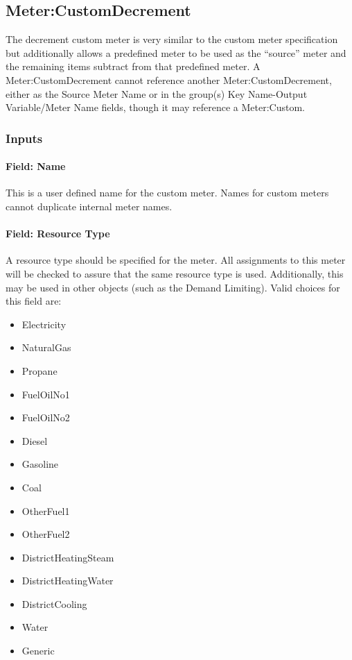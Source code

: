 \subsection{Meter:CustomDecrement}\label{metercustomdecrement}

The decrement custom meter is very similar to the custom meter specification but additionally allows a predefined meter to be used as the ``source'' meter and the remaining items subtract from that predefined meter. A Meter:CustomDecrement cannot reference another Meter:CustomDecrement, either as the Source Meter Name or in the group(s) Key Name-Output Variable/Meter Name fields, though it may reference a Meter:Custom.

\subsubsection{Inputs}\label{inputs-18-008}

\paragraph{Field: Name}\label{field-name-1-040}

This is a user defined name for the custom meter. Names for custom meters cannot duplicate internal meter names.

\paragraph{Field: Resource Type}\label{field-fuel-type-1-003}

A resource type should be specified for the meter. All assignments to this meter will be checked to assure that the same resource type is used. Additionally, this may be used in other objects (such as the Demand Limiting). Valid choices for this field are:

\begin{itemize}
    \item
    Electricity
    \item
    NaturalGas
    \item
    Propane
    \item
    FuelOilNo1
    \item
    FuelOilNo2
    \item
    Diesel
    \item
    Gasoline
    \item
    Coal
    \item
    OtherFuel1
    \item
    OtherFuel2
    \item
    DistrictHeatingSteam
    \item
    DistrictHeatingWater
    \item
    DistrictCooling
    \item
    Water
    \item
    Generic
\end{itemize}

